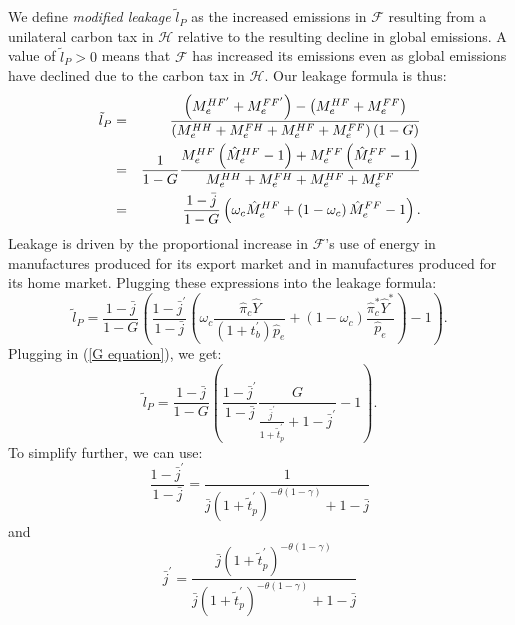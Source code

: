\documentclass[notitlepage,12pt]{article}
\begin{document}
We define \emph{modified leakage} $\tilde{l}_{P}$ as the increased emissions
in $\mathcal{F}$ resulting from a unilateral carbon tax in $\mathcal{H}$
relative to the resulting decline in global emissions. A value of $\tilde{l}%
_{P}>0$ means that $\mathcal{F}$ has increased its emissions even as global
emissions have declined due to the carbon tax in $\mathcal{H}$. Our leakage
formula is thus:%
\begin{eqnarray*}
\tilde{l}_{P} &=&\frac{\left( M_{e}^{HF^{\prime }}+M_{e}^{FF^{\prime
}}\right) -\left( M_{e}^{HF}+M_{e}^{FF}\right) }{\left(
M_{e}^{HH}+M_{e}^{FH}+M_{e}^{HF}+M_{e}^{FF}\right) \left( 1-G\right) } \\
&=&\frac{1}{1-G}\frac{M_{e}^{HF}\left( \hat{M}_{e}^{HF}-1\right)
+M_{e}^{FF}\left( \hat{M}_{e}^{FF}-1\right) }{%
M_{e}^{HH}+M_{e}^{FH}+M_{e}^{HF}+M_{e}^{FF}} \\
&=&\frac{1-\bar{j}}{1-G}\left( \omega _{c}\hat{M}_{e}^{HF}+\left( 1-\omega
_{c}\right) \hat{M}_{e}^{FF}-1\right) .
\end{eqnarray*}%
Leakage is driven by the proportional increase in $\mathcal{F}$'s use of
energy in manufactures produced for its export market and in manufactures
produced for its home market. Plugging these expressions into the leakage
formula:%
\begin{equation*}
\tilde{l}_{P}=\frac{1-\bar{j}}{1-G}\left( \frac{1-\bar{j}^{\prime }}{1-\bar{j%
}}\left( \omega _{c}\frac{\hat{\pi}_{c}\hat{Y}}{\left( 1+t_{b}^{\prime
}\right) \hat{p}_{e}}+\left( 1-\omega _{c}\right) \frac{\hat{\pi}_{c}^{\ast }%
\hat{Y}^{\ast }}{\hat{p}_{e}}\right) -1\right) .
\end{equation*}%
Plugging in (\ref{G equation}), we get:%
\begin{equation*}
\tilde{l}_{P}=\frac{1-\bar{j}}{1-G}\left( \frac{1-\bar{j}^{\prime }}{1-\bar{j%
}}\frac{G}{\frac{\bar{j}^{\prime }}{1+\tilde{t}_{p}^{\prime }}+1-\bar{j}%
^{\prime }}-1\right) .
\end{equation*}%
To simplify further, we can use:%
\begin{equation*}
\frac{1-\bar{j}^{\prime }}{1-\bar{j}}=\frac{1}{\bar{j}\left( 1+\tilde{t}%
_{p}^{\prime }\right) ^{-\theta \left( 1-\gamma \right) }+1-\bar{j}}
\end{equation*}%
and%
\begin{equation*}
\bar{j}^{\prime }=\frac{\bar{j}\left( 1+\tilde{t}_{p}^{\prime }\right)
^{-\theta \left( 1-\gamma \right) }}{\bar{j}\left( 1+\tilde{t}_{p}^{\prime
}\right) ^{-\theta \left( 1-\gamma \right) }+1-\bar{j}}
\end{equation*}%
\end{document}
